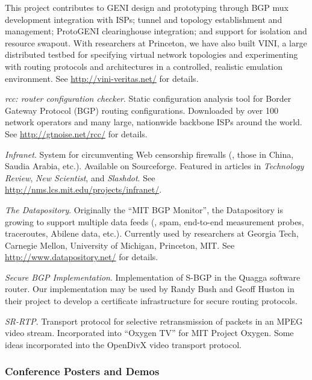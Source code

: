 \begin{pub}
  This project contributes to GENI design and prototyping through BGP
  mux development integration with ISPs; tunnel and topology
  establishment and management; ProtoGENI clearinghouse integration; and
  support for isolation and resource swapout.  With researchers at
  Princeton, we have also built VINI, a large distributed testbed for
  specifying virtual network topologies and experimenting with routing
  protocols and architectures in a controlled, realistic emulation
  environment.  See \url{http://vini-veritas.net/} for details.
%
\item {\em rcc: router configuration checker}.  Static configuration analysis
tool for Border Gateway Protocol (BGP) routing configurations.
Downloaded by over 100 network operators and many large, nationwide
backbone ISPs around the world.  See \url{http://gtnoise.net/rcc/} for
details. 
%
\item {\em Infranet}.  System for circumventing Web censorship firewalls
  (\eg, those in China, Saudia Arabia, etc.).  Available on
  Sourceforge.  Featured in articles in {\em Technology Review}, {\em
  New Scientist}, and {\em Slashdot}.  See
  \url{http://nms.lcs.mit.edu/projects/infranet/}.
\item {\em The Datapository}.  Originally the ``MIT BGP Monitor'', the
  Datapository is growing to support multiple data feeds (\eg, spam,
  end-to-end measurement probes, traceroutes, Abilene data, etc.).
  Currently used by researchers at Georgia Tech, Carnegie Mellon,
  University of Michigan, Princeton, MIT.  See
  \url{http://www.datapository.net/} for details.
%
\item {\em Secure BGP Implementation}.  Implementation of S-BGP in the
  Quagga software router.  Our implementation may be used by Randy Bush
  and Geoff Huston in their project to develop a certificate
  infrastructure for secure routing protocols.
%
\item {\em SR-RTP}.  Transport protocol for selective retransmission of
  packets in an MPEG video stream.  Incorporated into ``Oxygen TV'' for
  MIT Project Oxygen.  Some ideas incorporated into the OpenDivX
  video transport protocol.
\end{pub}

\subsubsection{Conference Posters and Demos}
\label{subsubsec:posters}

